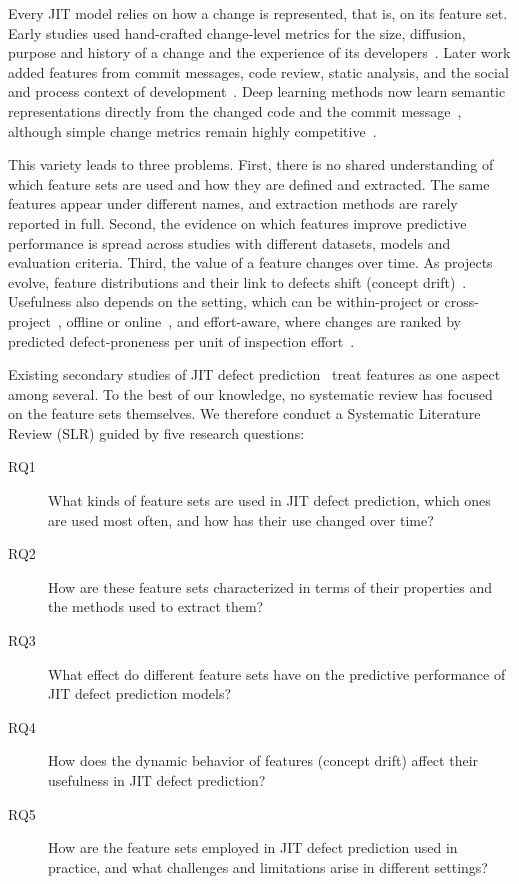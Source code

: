 \documentclass[sigconf,review]{acmart}
\begin{document}
Every JIT model relies on how a change is represented, that is, on its feature set. Early studies used hand-crafted change-level metrics for the size, diffusion, purpose and history of a change and the experience of its developers~\cite{kamei2013large}. Later work added features from commit messages, code review, static analysis, and the social and process context of development~\cite{guglielmi2025, barzoki2025}. Deep learning methods now learn semantic representations directly from the changed code and the commit message~\cite{hoang2019deepjit, hoang2020cc2vec, ye2025, jiang2025}, although simple change metrics remain highly competitive~\cite{zeng2021deep}.

This variety leads to three problems. First, there is no shared understanding of which feature sets are used and how they are defined and extracted. The same features appear under different names, and extraction methods are rarely reported in full. Second, the evidence on which features improve predictive performance is spread across studies with different datasets, models and evaluation criteria. Third, the value of a feature changes over time. As projects evolve, feature distributions and their link to defects shift (concept drift)~\cite{mcintosh2018fix}. Usefulness also depends on the setting, which can be within-project or cross-project~\cite{kamei2016studying, dai2025}, offline or online~\cite{cabral2019class, liu2025}, and effort-aware, where changes are ranked by predicted defect-proneness per unit of inspection effort~\cite{kamei2013large, yang2016effort}.

Existing secondary studies of JIT defect prediction~\cite{zhao2023systematic, alnagi2024just} treat features as one aspect among several. To the best of our knowledge, no systematic review has focused on the feature sets themselves. We therefore conduct a Systematic Literature Review (SLR) guided by five research questions:

\begin{description}
    \item[RQ1] What kinds of feature sets are used in JIT defect prediction, which ones are used most often, and how has their use changed over time?
    \item[RQ2] How are these feature sets characterized in terms of their properties and the methods used to extract them?
    \item[RQ3] What effect do different feature sets have on the predictive performance of JIT defect prediction models?
    \item[RQ4] How does the dynamic behavior of features (concept drift) affect their usefulness in JIT defect prediction?
    \item[RQ5] How are the feature sets employed in JIT defect prediction used in practice, and what challenges and limitations arise in different settings?
\end{description}
\end{document}
